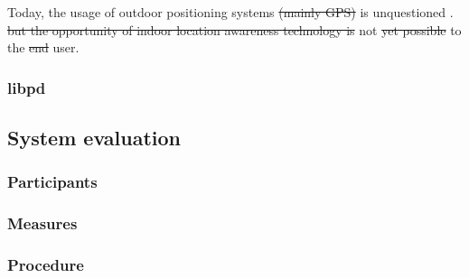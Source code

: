 
Today, the usage of outdoor positioning systems \st{(mainly GPS)} is unquestioned .  \st{but the opportunity of indoor location awareness technology is} not \st{yet possible}  to the \st{end}  user.







\subsubsection{libpd}

\subsection{System evaluation}


\subsubsection{Participants}

\subsubsection{Measures}

\subsubsection{Procedure}
